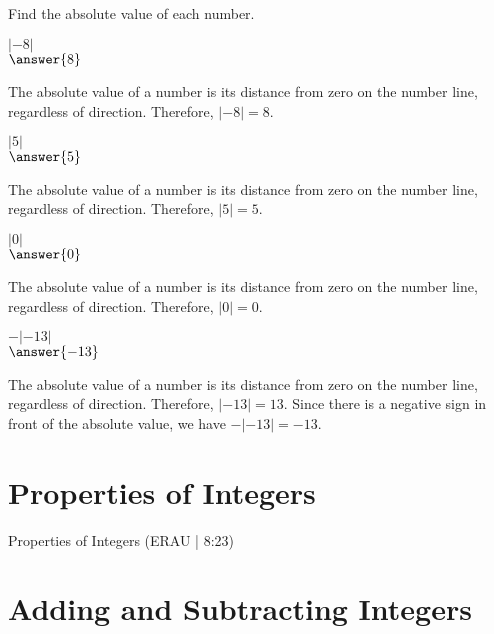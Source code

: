 \documentclass{ximera}
\begin{document}
Find the absolute value of each number.

\begin{problem}
$|-8|$\\
$\answer{8}$
\begin{feedback}
The absolute value of a number is its distance from zero on the number line, regardless of direction. Therefore, $|-8| = 8$.
\end{feedback}
\end{problem}

\begin{problem}
$|5|$\\
$\answer{5}$
\begin{feedback}
The absolute value of a number is its distance from zero on the number line, regardless of direction. Therefore, $|5| = 5$.
\end{feedback}
\end{problem}

\begin{problem}
$|0|$\\
$\answer{0}$
\begin{feedback}
The absolute value of a number is its distance from zero on the number line, regardless of direction. Therefore, $|0| = 0$.
\end{feedback}
\end{problem}

\begin{problem}
$-|-13|$\\
$\answer{-13}$
\begin{feedback}
The absolute value of a number is its distance from zero on the number line, regardless of direction. Therefore, $|-13| = 13$. Since there is a negative sign in front of the absolute value, we have $-|-13| = -13$.
\end{feedback}
\end{problem}


\section*{Properties of Integers}

Properties of Integers (ERAU | 8:23)



\section*{Adding and Subtracting Integers}
\end{document}
